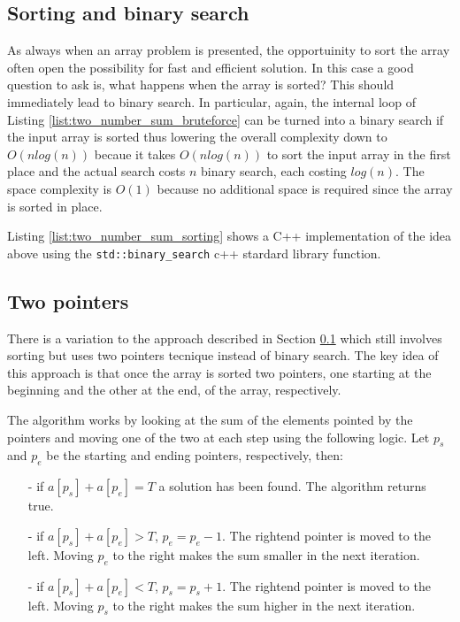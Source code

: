 \subsection{Sorting and binary search}
\label{sect:two_number_problem_binary_search}
As always when an array problem is presented, the opportuinity to sort the array often open the
possibility for fast and efficient solution. In this case a good question to ask is, what happens
when the array is sorted? This should immediately lead to binary search. In particular, again, the
internal loop of Listing \ref{list:two_number_sum_bruteforce} can be turned into a binary search if
the input array is sorted thus lowering the overall complexity down to $O(n log(n))$ becaue it takes
$O(n log(n))$ to sort the input array in the first place and the actual search costs $n$ binary
search, each costing $log(n)$. The space complexity is $O(1)$ because no additional space is
required since the array is sorted in place. 

Listing \ref{list:two_number_sum_sorting} shows a C++ implementation of the idea above using the
\texttt{std::binary\_search} c++ stardard library function.





\subsection{Two pointers}
\label{sec:two_numbers:twopointers}
There is a variation to the approach described in Section
\ref{sect:two_number_problem_binary_search} which still involves sorting but uses two pointers
tecnique instead of binary search. The key idea of this approach is that once the array is sorted
two pointers, one starting at the beginning and the other at the end, of the array, respectively.

The algorithm works by looking at the sum of the elements pointed by the pointers and moving one of
the two at each step using the following logic. Let $p_s$ and $p_e$ be the starting and ending
pointers, respectively, then:
\begin{itemize}
	\item[-] if $a[p_s]+a[p_e] = T$ a solution has been found. The algorithm returns true.
	\item[-] if $a[p_s]+a[p_e] > T$, $p_e=p_e-1$. The rightend pointer is moved to the left. Moving
	$p_e$ to the right makes the sum smaller in the next iteration. 
	\item[-] if $a[p_s]+a[p_e] < T$, $p_s=p_s+1$. The rightend pointer is moved to the left. Moving
	$p_s$ to the right makes the sum higher in the next iteration. 
\end{itemize}


